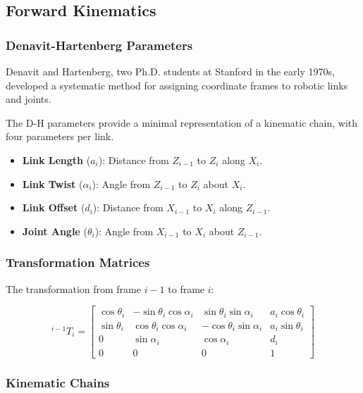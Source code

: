 \documentclass{article}
\begin{document}
\subsection{Forward Kinematics}

\subsubsection{Denavit-Hartenberg Parameters}

Denavit and Hartenberg, two Ph.D. students at Stanford in the early 1970s, developed a systematic method for assigning coordinate frames to robotic links and joints.

The D-H parameters provide a minimal representation of a kinematic chain, with four parameters per link.

\begin{itemize}
    \item \textbf{Link Length} ($a_i$): Distance from $Z_{i-1}$ to $Z_i$ along $X_i$.
    \item \textbf{Link Twist} ($\alpha_i$): Angle from $Z_{i-1}$ to $Z_i$ about $X_i$.
    \item \textbf{Link Offset} ($d_i$): Distance from $X_{i-1}$ to $X_i$ along $Z_{i-1}$.
    \item \textbf{Joint Angle} ($\theta_i$): Angle from $X_{i-1}$ to $X_i$ about $Z_{i-1}$.
\end{itemize}

\subsubsection{Transformation Matrices}

The transformation from frame $i-1$ to frame $i$:

$$
^{i-1}T_i = 
\begin{bmatrix}
    \cos\theta_i & -\sin\theta_i\cos\alpha_i & \sin\theta_i\sin\alpha_i & a_i\cos\theta_i \\
    \sin\theta_i & \cos\theta_i\cos\alpha_i & -\cos\theta_i\sin\alpha_i & a_i\sin\theta_i \\
    0 & \sin\alpha_i & \cos\alpha_i & d_i \\
    0 & 0 & 0 & 1
\end{bmatrix}
$$

\subsubsection{Kinematic Chains}
\end{document}
